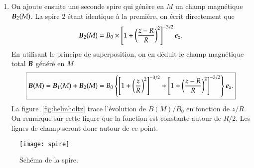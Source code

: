 \begin{corrige}
\begin{enumerate}
	  \item On ajoute ensuite une seconde spire qui génère en $M$ un champ magnétique
		$\vecb_2(M)$. La spire $2$ étant identique à la première, on écrit
		directement que
		\begin{equation*}
			\vecb_2(M) = B_0 \times \left[1 + \left(\dfrac{z - R}{R}\right)^2
			\right]^{-3/2}\ez.
		\end{equation*}
		En utilisant le principe de superposition, on en déduit le champ
		magnétique total $\vecb$ généré en $M$
		\begin{equation*}
			\boxed{\vecb(M) = \vecb_1(M) + \vecb_2(M) 
			         = B_0 \left\{\left[1 + \left(\dfrac{z}{R}\right)^2
				 \right]^{-3/2} + \left[1 + \left(\dfrac{z-R}{R}\right)^2
	 \right]^{-3/2}\right\} \ez.}
		\end{equation*} 
		La figure~\ref{fig:helmholtz} trace l'évolution de $B(M)/B_0$ 
		en fonction de $z/R$. On remarque sur cette figure que la fonction est
		constante autour de $R/2$. Les lignes de champ seront donc 
		autour de ce point.

	\end{enumerate}

\end{corrige}
\begin{figure}[htpb]
	\centering
	\texttt{[image: spire]}
	\caption{Schéma de la spire.}%
	\label{fig:spire_ex}
\end{figure}
